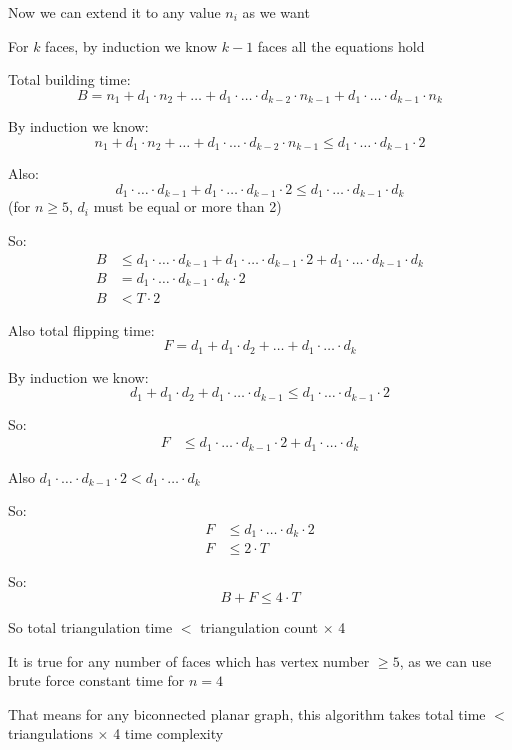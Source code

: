 \documentclass[12pt,a4paper]{article}
\begin{document}
Now we can extend it to any value $n_i$ as we want 

For $k$ faces, by induction we know $k-1$ faces all the equations hold

Total building time:
\[
B = n_1 + d_1 \cdot n_2 + \ldots + d_1 \cdot \ldots \cdot d_{k-2} \cdot n_{k-1} + d_1 \cdot \ldots \cdot d_{k-1} \cdot n_k
\]

By induction we know:
\[
n_1 + d_1 \cdot n_2 + \ldots + d_1 \cdot \ldots \cdot d_{k-2} \cdot n_{k-1} \leq d_1 \cdot \ldots \cdot d_{k-1} \cdot 2
\]

Also:
\[
d_1 \cdot \ldots \cdot d_{k-1} + d_1 \cdot \ldots \cdot d_{k-1} \cdot 2 \leq d_1 \cdot \ldots \cdot d_{k-1} \cdot d_k
\]
(for $n \geq 5$, $d_i$ must be equal or more than 2)

So:
\begin{align*}
B &\leq d_1 \cdot \ldots \cdot d_{k-1} + d_1 \cdot \ldots \cdot d_{k-1} \cdot 2 + d_1 \cdot \ldots \cdot d_{k-1} \cdot d_k \\
B &= d_1 \cdot \ldots \cdot d_{k-1} \cdot d_k \cdot 2 \\
B &< T \cdot 2
\end{align*}

Also total flipping time:
\[
F = d_1 + d_1 \cdot d_2 + \ldots + d_1 \cdot \ldots \cdot d_k
\]

By induction we know:
\[
d_1 + d_1 \cdot d_2 + d_1 \cdot \ldots \cdot d_{k-1} \leq d_1 \cdot \ldots \cdot d_{k-1} \cdot 2
\]

So:
\begin{align*}
F &\leq d_1 \cdot \ldots \cdot d_{k-1} \cdot 2 + d_1 \cdot \ldots \cdot d_k
\end{align*}

Also $d_1 \cdot \ldots \cdot d_{k-1} \cdot 2 < d_1 \cdot \ldots \cdot d_k$

So:
\begin{align*}
F &\leq d_1 \cdot \ldots \cdot d_k \cdot 2 \\
F &\leq 2 \cdot T
\end{align*}

So:
\[
B + F \leq 4 \cdot T
\]

So total triangulation time $<$ triangulation count $\times$ 4

It is true for any number of faces which has vertex number $\geq 5$, as we can use brute force constant time for $n=4$

That means for any biconnected planar graph, this algorithm takes total time $<$ triangulations $\times$ 4 time complexity
\end{document}
